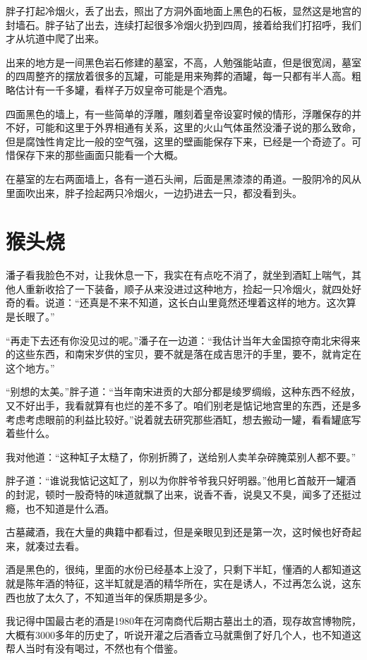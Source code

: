胖子打起冷烟火，丢了出去，照出了方洞外面地面上黑色的石板，显然这是地宫的封墙石。胖子钻了出去，连续打起很多冷烟火扔到四周，接着给我们打招呼，我们才从坑道中爬了出来。

出来的地方是一间黑色岩石修建的墓室，不高，人勉强能站直，但是很宽阔，墓室的四周整齐的摆放着很多的瓦罐，可能是用来殉葬的酒罐，每一只都有半人高。粗略估计有一千多罐，看样子万奴皇帝可能是个酒鬼。

四面黑色的墙上，有一些简单的浮雕，雕刻着皇帝设宴时候的情形，浮雕保存的并不好，可能和这里于外界相通有关系，这里的火山气体虽然没潘子说的那么致命，但是腐蚀性肯定比一般的空气强，这里的壁画能保存下来，已经是一个奇迹了。可惜保存下来的那些画面只能看一个大概。

在墓室的左右两面墙上，各有一道石头闸，后面是黑漆漆的甬道。一股阴冷的风从里面吹出来，胖子捡起两只冷烟火，一边扔进去一只，都没看到头。

\chapter{猴头烧}

潘子看我脸色不对，让我休息一下，我实在有点吃不消了，就坐到酒缸上喘气，其他人重新收拾了一下装备，顺子从来没进过这种地方，捡起一只冷烟火，就四处好奇的看。说道：“还真是不来不知道，这长白山里竟然还埋着这样的地方。这次算是长眼了。”

“再走下去还有你没见过的呢。”潘子在一边道：“我估计当年大金国掠夺南北宋得来的这些东西，和南宋岁供的宝贝，要不就是落在成吉思汗的手里，要不，就肯定在这个地方。”

“别想的太美。”胖子道：“当年南宋进贡的大部分都是绫罗绸缎，这种东西不经放，又不好出手，我看就算有也烂的差不多了。咱们别老是惦记地宫里的东西，还是多考虑考虑眼前的利益比较好。”说着就去研究那些酒缸，想去搬动一罐，看看罐底写着些什么。

我对他道：“这种缸子太糙了，你别折腾了，送给别人卖羊杂碎腌菜别人都不要。”

胖子道：“谁说我惦记这缸了，别以为你胖爷爷我只好明器。”他用匕首敲开一罐酒的封泥，顿时一股奇特的味道就飘了出来，说香不香，说臭又不臭，闻多了还挺过瘾，也不知道是什么酒。

古墓藏酒，我在大量的典籍中都看过，但是亲眼见到还是第一次，这时候也好奇起来，就凑过去看。

酒是黑色的，很纯，里面的水份已经基本上没了，只剩下半缸，懂酒的人都知道这就是陈年酒的特征，这半缸就是酒的精华所在，实在是诱人，不过再怎么说，这东西也放了太久了，不知道当年的保质期是多少。

我记得中国最古老的酒是1980年在河南商代后期古墓出土的酒，现存故宫博物院，大概有3000多年的历史了，听说开灌之后酒香立马就熏倒了好几个人，也不知道这帮人当时有没有喝过，不然也有个借鉴。

